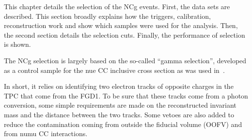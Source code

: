

This chapter details the selection of the \Gls{NCg} events. First, the
data sets are described. This section broadly explains how the
triggers, calibration, reconstruction work and show which samples were
used for the analysis. Then, the second section details the selection
cuts. Finally, the performance of selection is shown.

The \Gls{NCg} selection is largely based on the so-called ``gamma
selection'', developed as a control sample for the \Gls{nue} \Gls{CC}
inclusive cross section as was used in~\cite{nueT2K}.

In short, it relies on identifying two electron tracks of opposite
charges in the \Gls{TPC} that come from the \Gls{FGD}1. To be sure
that these tracks come from a photon conversion, some simple
requirements are made on the reconstructed invariant mass and the
distance between the two tracks. Some vetoes are also added to reduce
the contamination coming from outside the fiducial volume (\Gls{OOFV})
and from \Gls{numu} \Gls{CC} interactions.




